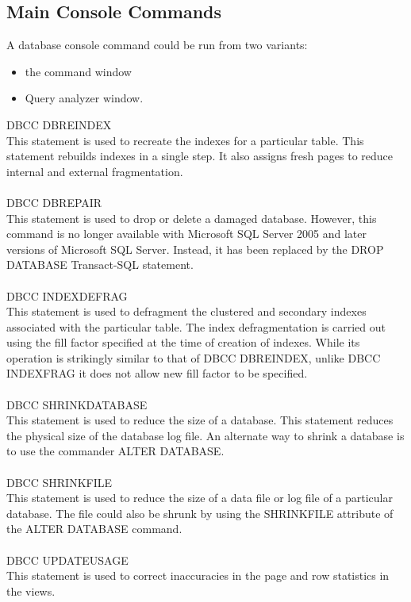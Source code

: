 \documentclass[english]{article}
\begin{document}
\subsection{Main Console Commands}
A database console command could be run from two variants:
\begin{itemize}
\item the command window 
\item Query analyzer window.
\end{itemize}
DBCC DBREINDEX\\
This statement is used to recreate the indexes for a particular table. This statement rebuilds indexes in a single step. It also assigns fresh pages to reduce internal and external fragmentation.\\\\ 
DBCC DBREPAIR\\
This statement is used to drop or delete a damaged database. However, this command is no longer available with Microsoft SQL Server 2005 and later versions of Microsoft SQL Server. Instead, it has been replaced by the DROP DATABASE Transact-SQL statement. \\\\
DBCC INDEXDEFRAG\\
This statement is used to defragment the clustered and secondary indexes associated with the particular table. The index defragmentation is carried out using the fill factor specified at the time of creation of indexes. While its operation is strikingly similar to that of DBCC DBREINDEX, unlike DBCC INDEXFRAG it does not allow new fill factor to be specified.\\\\ 
DBCC SHRINKDATABASE\\
This statement is used to reduce the size of a database. This statement reduces the physical size of the database log file. An alternate way to shrink a database is to use the commander ALTER DATABASE. \\\\ 
DBCC SHRINKFILE\\
This statement is used to reduce the size of a data file or log file of a particular database. The file could also be shrunk by using the SHRINKFILE attribute of the ALTER DATABASE command. 
\\\\ 
DBCC UPDATEUSAGE\\
This statement is used to correct inaccuracies in the page and row statistics in the views.
\\\\ 
\end{document}
